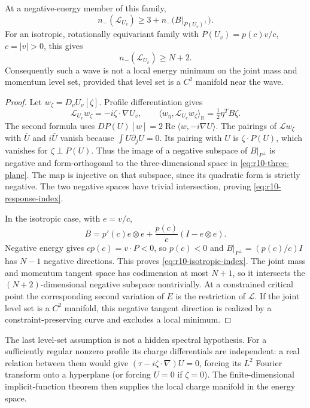 \begin{theorem}
\label{thm:r10-response-index}
At a negative-energy member of this family,
\begin{equation}\label{eq:r10-response-index}
 n_-(\mathcal L_{U_v})\ge
 3+n_-\bigl(B|_{P(U_v)^\perp}\bigr).
\end{equation}
For an isotropic, rotationally equivariant family with
$P(U_v)=p(c)v/c$, $c=|v|>0$, this gives
\begin{equation}\label{eq:r10-isotropic-index}
 n_-(\mathcal L_{U_v})\ge N+2.
\end{equation}
Consequently such a wave is not a local energy minimum on the
joint mass and momentum level set, provided that level set is a
$C^2$ manifold near the wave.
\end{theorem}
\begin{proof}
Let $w_\zeta=D_vU_v[\zeta]$.  Profile differentiation gives
\[
 \mathcal L_{U_v}w_\zeta=-i\zeta\cdot\nabla U_v,
 \qquad
 \langle w_\eta,\mathcal L_{U_v}w_\zeta\rangle_{\mathbb R}
       =\tfrac12\eta^TB\zeta.
\]
The second formula uses
$DP(U)[w]=2\operatorname{Re}\langle w,-i\nabla U\rangle$.
The pairings of $\mathcal Lw_\zeta$ with $\overline U$ and
$i\overline U$ vanish because $\int U\partial_jU=0$.
Its pairing with $U$ is $\zeta\cdot P(U)$, which vanishes for
$\zeta\perp P(U)$.
Thus the image of a negative subspace of $B|_{P^\perp}$ is negative
and form-orthogonal to the three-dimensional space in
\eqref{eq:r10-three-plane}.  The map is injective on that subspace,
since its quadratic form is strictly negative.  The two negative
spaces have trivial intersection, proving \eqref{eq:r10-response-index}.

In the isotropic case, with $e=v/c$,
\[
 B=p'(c)e\otimes e+\frac{p(c)}c(I-e\otimes e).
\]
Negative energy gives $cp(c)=v\cdot P<0$, so $p(c)<0$ and
$B|_{P^\perp}=(p(c)/c)I$ has $N-1$ negative directions.
This proves \eqref{eq:r10-isotropic-index}.
The joint mass and momentum tangent space has codimension at most
$N+1$, so it intersects the $(N+2)$-dimensional negative subspace
nontrivially.  At a constrained critical point the corresponding
second variation of $E$ is the restriction of $\mathcal L$.
If the joint level set is a $C^2$ manifold, this negative tangent
direction is realized by a constraint-preserving curve and excludes
a local minimum.
\end{proof}

The last level-set assumption is not a hidden spectral hypothesis.
For a sufficiently regular nonzero profile its charge differentials
are independent: a real relation between them would give
$(\tau-i\zeta\cdot\nabla)U=0$, forcing its $L^2$ Fourier transform
onto a hyperplane (or forcing $U=0$ if $\zeta=0$).
The finite-dimensional implicit-function theorem then supplies the
local charge manifold in the energy space.

